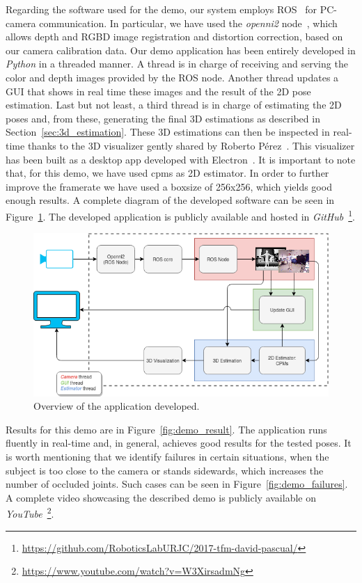 Regarding the software used for the demo, our system employs ROS~\cite{ros} for PC-camera communication. In particular, we have used the \emph{openni2} node~\cite{openni}, which allows depth and RGBD image registration and distortion correction, based on our camera calibration data. Our demo application has been entirely developed in \emph{Python} in a threaded manner. A thread is in charge of receiving and serving the color and depth images provided by the ROS node. Another thread updates a GUI that shows in real time these images and the result of the 2D pose estimation. Last but not least, a third thread is in charge of estimating the 2D poses and, from these, generating the final 3D estimations as described in Section~\ref{sec:3d_estimation}. These 3D estimations can then be inspected in real-time thanks to the 3D visualizer gently shared by Roberto Pérez~\cite{perez_gonzalez_2019}. This visualizer has been built as a desktop app developed with Electron~\cite{electron}. It is important to note that, for this demo, we have used \glspl{cpm} as 2D estimator. In order to further improve the framerate we have used a boxsize of 256x256, which yields good enough results. A complete diagram of the developed software can be seen in Figure~\ref{fig:sw}. The  developed application is publicly available and hosted in \emph{GitHub}~\footnote{\url{https://github.com/RoboticsLabURJC/2017-tfm-david-pascual/}}.%

\begin{figure}[h]
    \centering
    \includegraphics[width=\textwidth]{figures/sw.png}
    \caption{Overview of the application developed.}
    \label{fig:sw}
\end{figure}

Results for this demo are in Figure~\ref{fig:demo_result}. The application runs fluently in real-time and, in general, achieves good results for the tested poses. It is worth mentioning that we identify failures in certain situations, \eg when the subject is too close to the camera or stands sidewards, which increases the number of occluded joints. Such cases can be seen in Figure~\ref{fig:demo_failures}. A complete video showcasing the described demo is publicly available on \emph{YouTube}~\footnote{\url{https://www.youtube.com/watch?v=W3XirsadmNg}}.

